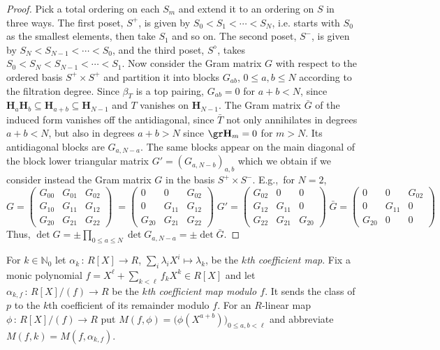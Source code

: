 \documentclass[a4paper,11pt]{amsart}
\def\map#1#2{\,{:}\,#1\!\longrightarrow\!#2}
\numberwithin{equation}{subsection}
\theoremstyle{definition}
\theoremstyle{theorem}
\theoremstyle{remark}
\newcommand\N{\mathbb{N}}
\begin{document}
\begin{proof}
Pick a total ordering on each $S_m$ and extend it to an ordering on $S$ in three ways.
The first poset, $S^+$, is given by $S_0<S_1<\cdots <S_N$, i.e. starts with $S_0$ as the smallest elements, then take $S_1$ and so on.
The second poset,  $S^-$, is given by $S_N<S_{N-1}<\cdots <S_0$, and the third poset,  $S^\diamond$,  takes $S_0<S_{N}<S_{N-1}<\cdots<S_{1}$.
Now consider the Gram matrix $G$ with respect to the ordered  basis $S^+\times S^+$ and  partition it  into blocks $G_{ab}$, $0\leq a,b\leq N$ according to the filtration degree.  Since $\beta_T$ is a top pairing, $G_{ab}=0$ for $a+b<N$, since  $\mathbf{H}_a\mathbf{H}_b\subseteq\mathbf{H}_{a+b}\subseteq\mathbf{H}_{N-1}$ and $T$ vanishes on $\mathbf{H}_{N-1}$. The Gram matrix $\bar G$ of the induced form vanishes off the antidiagonal, since $\bar T$ not only annihilates in degrees $a+b<N$, but also in degrees $a+b>N$ since $\gr\mathbf{H}_m=0$ for $m>N$. Its antidiagonal blocks are $G_{a,N-a}$.
The same blocks appear on the main diagonal of the block lower triangular matrix $G'=(G_{a,N-b})_{a,b}$ which we obtain if we consider instead the Gram matrix $G$ in the basis $S^+\times S^-$.  E.g.,~for $N=2$,
  \small
  \[G=
  \begin{pmatrix}
      G_{00}&G_{01}&G_{02}\\ G_{10}&G_{11}&G_{12}\\ G_{20}&G_{21}&G_{22}
    \end{pmatrix}\;
    =\begin{pmatrix}
      0&0&G_{02}\\ 0&G_{11}&G_{12}\\ G_{20}&G_{21}&G_{22}
    \end{pmatrix}\;
   G'=\begin{pmatrix}
      G_{02}&0&0\\ G_{12}&G_{11}&0\\ G_{22}&G_{21}&G_{20}
    \end{pmatrix}\;
     \bar G=\begin{pmatrix}
      0&0&G_{02}\\ 0&G_{11}&0\\ G_{20}&0&0
    \end{pmatrix}\;
  \]
   \normalsize
Thus,  $\det G= \pm\prod_{0\leq a\leq N}\det G_{a,N-a}=\pm \det \bar{G}$.
  \end{proof}

For $k\in\N_0$ let $\alpha_k\map{R[X]}R$, $\sum_i\lambda_iX^{i}\mapsto\lambda_k$, be the
\emph{$k$th coefficient map}. Fix a monic polynomial $f=X^{\ell}+\sum_{k<\ell}f_kX^{k}\in R[X]$
and let $\alpha_{k,f}\map{R[X]/(f)}R$ be the \emph{$k$th coefficient map modulo $f$}. It sends the
class of $p$ to the $k$th coefficient of its remainder modulo $f$. For an $R$-linear map
$\phi\map{R[X]/(f)}R$ put $M(f,\phi)=\bigl(\phi(X^{a+b})\bigr)_{0\leq a,b<\ell}$ and abbreviate
$M(f,k)=M(f,\alpha_{k,f})$.
\end{document}
